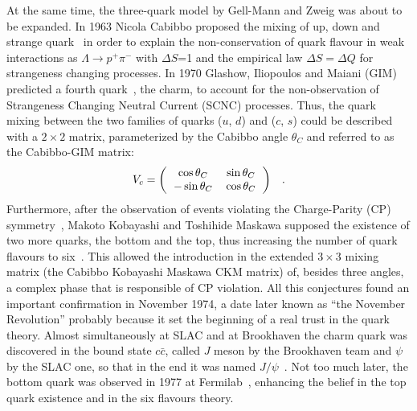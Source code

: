 At the same time, the three-quark model by Gell-Mann and Zweig was about to 
be expanded. In 1963 Nicola Cabibbo proposed the mixing of up, down and 
strange quark~\cite{} in order to explain the non-conservation of quark flavour 
in weak interactions as $\Lambda \rightarrow p^{+}\pi^{-}$ with $\Delta S$=1 
and the empirical law $\Delta S = \Delta Q$ for strangeness changing processes. 
In 1970 Glashow, Iliopoulos and Maiani (GIM) predicted a fourth quark~\cite{}, 
the charm, to account for the non-observation of Strangeness Changing Neutral 
Current (SCNC) processes. Thus, the quark mixing between the two families
of quarks ($u$, $d$) and ($c$, $s$) could be described with a $2\times 2$ 
matrix, parameterized by the Cabibbo angle $\theta_{C}$ and referred to as
 the Cabibbo-GIM matrix:
\begin{equation}\label{CabibboGIM}
V_{c} = {\setlength\arraycolsep{6pt}
\left( \begin{array}{cc}
\cos\theta_{C} & \sin\theta_{C}\\
-\sin\theta_{C}& \cos\theta_{C}
\end{array}
\right)} \quad .
\end{equation}
Furthermore, after the observation of events violating the Charge-Parity (CP) 
symmetry~\cite{}, Makoto Kobayashi and Toshihide Maskawa supposed the 
existence of two more quarks, the bottom and the top, thus increasing 
the number of quark flavours to six~\cite{}. This allowed the introduction in 
the extended $3\times 3$ mixing matrix (the Cabibbo Kobayashi Maskawa CKM matrix) 
of, besides three angles, a complex phase that is responsible of CP violation. 
All this conjectures found an important confirmation in November 1974, a date
later known as ``the November Revolution'' probably because it set the 
beginning of a real trust in the quark theory. 
Almost simultaneously at SLAC and at Brookhaven the charm quark was discovered 
in the bound state $c\bar c$, called $J$ meson by the Brookhaven team and 
$\psi$ by the SLAC one, so that in the end it was named $J/\psi$~\cite{}. 
Not too much later, the bottom quark was observed in 1977 at Fermilab~\cite{}, 
enhancing the belief in the top quark existence and in the six flavours theory.

